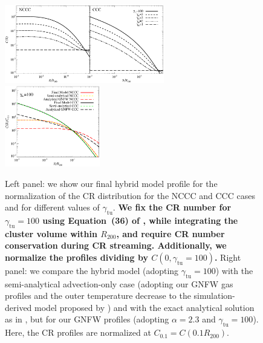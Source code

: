 \documentclass[traditabstract]{aa}
\def\C#1{{\bf #1}}
\newcommand{\rmn}{\mathrm}
\begin{document}
\begin{figure}[t]
\centering
\includegraphics[width=0.62\textwidth]{figures/CR_profiles_FinalModel.eps}
\includegraphics[width=0.37\textwidth]{figures/CR_profiles_FinalModelvsREX_norm0.1.eps}
\caption{Left panel: we show our final hybrid model profile for the normalization of
  the CR distribution for the NCCC and CCC cases and for
  different values of $\gamma_{\rmn{tu}}$. \C{We fix the CR number 
  for $\gamma_{\rmn{tu}}=100$ using Equation~(36) of \cite{2011A&A...527A..99E}, 
  while integrating the cluster volume within $R_{200}$, and require CR number
  conservation during CR streaming. Additionally, we normalize the profiles
  dividing by $C(0,\gamma_{\rmn{tu}}=100)$.}
  Right panel: we compare the hybrid model (adopting $\gamma_{\rmn{tu}}=100$) with the semi-analytical
  advection-only case (adopting our GNFW gas profiles and the outer temperature
  decrease to the simulation-derived model proposed by
  \citealp{2010MNRAS.409..449P}) and with the exact analytical solution as in
  \citet{2011A&A...527A..99E}, but for our GNFW profiles (adopting $\alpha=2.3$
  and $\gamma_{\rmn{tu}}=100$). Here, the CR profiles are normalized at
  $C_{0.1}=C(0.1R_{200})$.}
\label{fig:CRFinalModel}
\end{figure}
\end{document}

